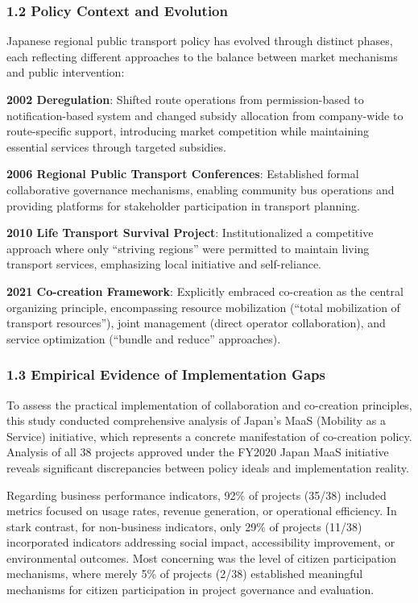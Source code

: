 \subsubsection{1.2 Policy Context and
Evolution}\label{policy-context-and-evolution}

Japanese regional public transport policy has evolved through distinct
phases, each reflecting different approaches to the balance between
market mechanisms and public intervention:

\textbf{2002 Deregulation}: Shifted route operations from
permission-based to notification-based system and changed subsidy
allocation from company-wide to route-specific support, introducing
market competition while maintaining essential services through targeted
subsidies.

\textbf{2006 Regional Public Transport Conferences}: Established formal
collaborative governance mechanisms, enabling community bus operations
and providing platforms for stakeholder participation in transport
planning.

\textbf{2010 Life Transport Survival Project}: Institutionalized a
competitive approach where only ``striving regions'' were permitted to
maintain living transport services, emphasizing local initiative and
self-reliance.

\textbf{2021 Co-creation Framework}: Explicitly embraced co-creation as
the central organizing principle, encompassing resource mobilization
(``total mobilization of transport resources''), joint management
(direct operator collaboration), and service optimization (``bundle and
reduce'' approaches).

\subsubsection{1.3 Empirical Evidence of Implementation
Gaps}\label{empirical-evidence-of-implementation-gaps}

To assess the practical implementation of collaboration and co-creation
principles, this study conducted comprehensive analysis of Japan's MaaS
(Mobility as a Service) initiative, which represents a concrete
manifestation of co-creation policy. Analysis of all 38 projects
approved under the FY2020 Japan MaaS initiative reveals significant
discrepancies between policy ideals and implementation reality.

Regarding business performance indicators, 92\% of projects (35/38)
included metrics focused on usage rates, revenue generation, or
operational efficiency. In stark contrast, for non-business indicators,
only 29\% of projects (11/38) incorporated indicators addressing social
impact, accessibility improvement, or environmental outcomes. Most
concerning was the level of citizen participation mechanisms, where
merely 5\% of projects (2/38) established meaningful mechanisms for
citizen participation in project governance and evaluation.

